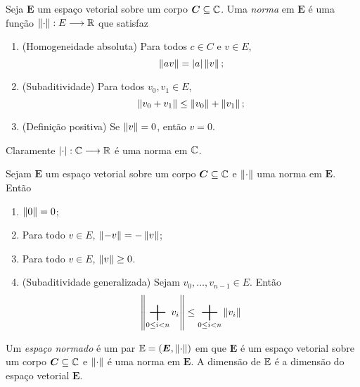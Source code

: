 \begin{defi}
Seja $\bm E$ um espaço vetorial sobre um corpo $\bm C \subseteq \mathbb{C}$. Uma \emph{norma} em $\bm E$ é uma função $\left\Vert{\cdot}\right\Vert: E \longrightarrow \mathbb{R}$
que satisfaz
	\begin{enumerate}
	\item (Homogeneidade absoluta) Para todos $c \in C$ e $v \in E$,
		\begin{equation*}
		\left\Vert{a v}\right\Vert = \left\vert{a}\right\vert\left\Vert{v}\right\Vert;
		\end{equation*}
	\item (Subaditividade) Para todos $v_0,v_1 \in E$,
		\begin{equation*}
		\left\Vert{v_0 + v_1}\right\Vert \leq \left\Vert{v_0}\right\Vert + \left\Vert{v_1}\right\Vert;
		\end{equation*}
	\item (Definição positiva) Se $\left\Vert{v}\right\Vert=0$, então $v=0$.
	\end{enumerate}
\end{defi}

Claramente $\left\vert{\cdot}\right\vert: \mathbb{C} \longrightarrow \mathbb{R}$ é uma norma em $\mathbb{C}$.

\begin{prop}
Sejam $\bm E$ um espaço vetorial sobre um corpo $\bm C \subseteq \mathbb{C}$ e $\left\Vert{\cdot}\right\Vert$ uma norma em $\bm E$. Então
	\begin{enumerate}
	\item $\left\Vert{0}\right\Vert=0$;
	\item Para todo $v \in E$, $\left\Vert{-v}\right\Vert=-\left\Vert{v}\right\Vert$;
	\item Para todo $v \in E$, $\left\Vert{v}\right\Vert \geq 0$.
	\item (Subaditividade generalizada) Sejam $v_0,\dots,v_{n-1} \in E$. Então
		\begin{equation*}
		\nor{\bigplus_{0\leq i < n} v_i} \leq \bigplus_{0\leq i < n}\nor{v_i}
		\end{equation*}
	\end{enumerate}
\end{prop}

\begin{defi}
Um \emph{espaço normado} é um par $\mathbb{E} = (\bm E,\left\Vert{\cdot}\right\Vert)$ em que $\bm E$ é um espaço vetorial sobre um corpo $\bm C \subseteq \mathbb{C}$ e $\left\Vert{\cdot}\right\Vert$ é uma norma em $\bm E$. A dimensão de $\mathbb{E}$ é a dimensão do espaço vetorial $\bm E$.
\end{defi}

